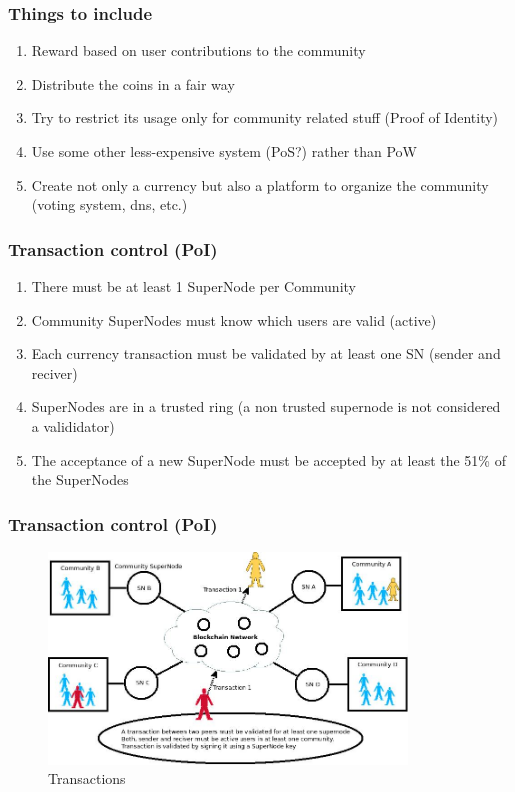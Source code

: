 \documentclass[usepdftitle=false,13pt]{beamer}
\begin{document}
\begin{frame}\frametitle{Things to include}
\begin{enumerate}
		\item Reward based on user contributions to the community
		\item Distribute the coins in a fair way
		\item Try to restrict its usage only for community related stuff (Proof of Identity)
		\item Use some other less-expensive system (PoS?) rather than PoW
		\item Create not only a currency but also a platform to organize the community (voting system, dns, etc.)
\end{enumerate}
\end{frame}


\begin{frame}\frametitle{Transaction control (PoI)}
\begin{enumerate}
		\item There must be at least 1 SuperNode per Community
		\item Community SuperNodes must know which users are valid (active)
		\item Each currency transaction must be validated by at least one SN (sender and reciver)
		\item SuperNodes are in a trusted ring (a non trusted supernode is not considered a valididator)
		\item The acceptance of a new SuperNode must be accepted by at least the 51\% of the SuperNodes
\end{enumerate}
\end{frame}


\begin{frame}\frametitle{Transaction control (PoI)}
\begin{figure}[h!]
\begin{center}
\includegraphics[width=0.85\textwidth]{pic/transactions}
\caption{Transactions}
\label{fig:block}
\end{center}
\end{figure}
\end{frame}
\end{document}
